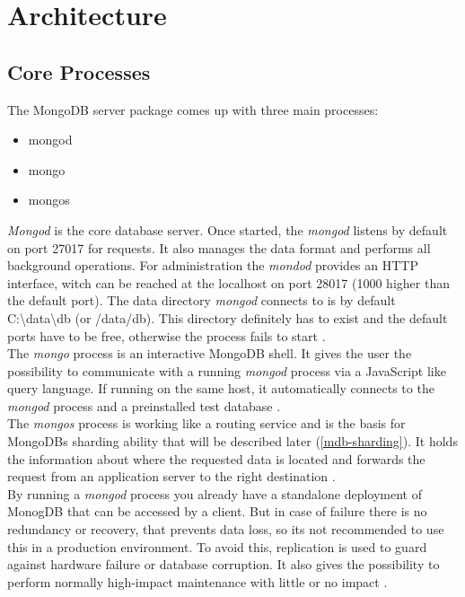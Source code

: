 \newcommand{\anfu}[1]{\glqq #1\grqq}
\newcommand{\anfuc}[3]{\anfu{#1}\cite[{#2}]{#3}}

\section{Architecture}
\subsection{Core Processes}\label{mdb-core}
The MongoDB server package comes up with three main processes:
\begin{itemize}
  \item mongod
  \item mongo
  \item mongos
\end{itemize}
\textit{Mongod} is the core database server. Once started, the \textit{mongod} listens by default on port 27017 for requests. It also manages the data format and performs all background operations. For administration the \textit{mondod} provides an HTTP interface, witch can be reached at the localhost on port 28017 (1000 higher than the default port). The data directory \textit{mongod} connects to is by default C:\textbackslash data\textbackslash db (or /data/db). This directory definitely has to exist and the default ports have to be free, otherwise the process fails to start \cite{Edward2015}.\\
The \textit{mongo} process is an interactive MongoDB shell. It gives the user the possibility to communicate with a running \textit{mongod} process via a JavaScript like query language. If running on the same host, it automatically connects to the \textit{mongod} process and a preinstalled test database \cite{Edward2015}.\\
The \textit{mongos} process is working like a routing service and is the basis for MongoDBs sharding ability that will be described later (\ref{mdb-sharding}). It holds the information about where the requested data is located and forwards the request from an application server to the right destination \cite{Edward2015}. \\
By running a \textit{mongod} process you already have a standalone deployment of MonogDB that can be accessed by a client. But in case of failure there is no redundancy or recovery, that prevents data loss, so its not recommended to use this in a production environment. To avoid this, replication is used to guard against hardware failure or database corruption. It also gives the possibility to perform normally high-impact maintenance with little or no impact \cite{Hows2013}.

